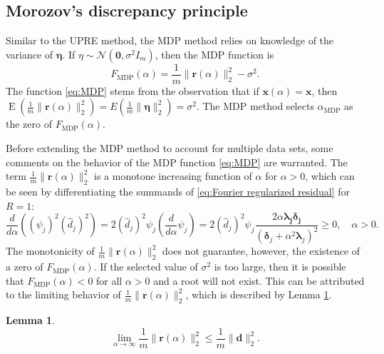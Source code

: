 \documentclass[12pt]{article}
\newcommand{\mA}{m}	%
\newcommand{\dVec}{\mathbf{d}}	%
\newcommand{\rVec}{\mathbf{r}}	%
\newcommand{\xVec}{\mathbf{x}}	%
\newcommand{\dft}[1]{\widehat{#1}}	%
\newcommand{\regparam}{\alpha}  %
\newcommand{\xReg}{\xVec(\regparam)}	%
\newcommand{\mfilt}{\psi}
\newcommand{\noise}{\eta}	%
\newcommand{\noiseSD}{\sigma}	%
\newcommand{\noiseVec}{\bm{\noise}}	%
\DeclareMathOperator{\E}{E}	%
\newcommand{\D}{F_{\text{MDP}}}	%
\newtheorem{lemma}{Lemma}[section]
\begin{document}
\subsection{Morozov's discrepancy principle} \label{sec:MDP}
Similar to the UPRE method, the MDP method relies on knowledge of the variance of $\noiseVec$. If $\noise \sim \mathcal{N}(\bm{0},\noiseSD^2 I_{\mA})$, then the MDP function is 
\begin{equation}
\label{eq:MDP}
\D(\regparam) = \frac{1}{\mA}\|\rVec(\regparam)\|_2^2 - \noiseSD^2.
\end{equation}
The function \eqref{eq:MDP} stems from the observation that if $\xReg = \xVec$, then $\E(\frac{1}{\mA}\|\rVec(\regparam)\|_2^2) = E(\frac{1}{\mA}\|\noiseVec\|_2^2) = \noiseSD^2$. The MDP method selects $\regparam_{\text{MDP}}$ as the zero of $\D(\regparam)$.  \par 
Before extending the MDP method to account for multiple data sets, some comments on the behavior of the MDP function \eqref{eq:MDP} are warranted. The term $\frac{1}{\mA}\|\rVec(\regparam)\|_2^2$ is a monotone increasing function of $\regparam$ for $\regparam > 0$, which can be seen by differentiating the summands of \eqref{eq:Fourier regularized residual} for $R = 1$:
\[\frac{d}{d\regparam}\left(\left(\mfilt_j\right)^2\left(\dft{d}_j\right)^2\right) = 2 \left(\dft{d}_j\right)^2 \mfilt_j\left(\frac{d}{d\regparam}\mfilt_j\right) = 2 \left(\dft{d}_j\right)^2 \mfilt_j \frac{2\regparam\bm{\lambda_j}\bm{\delta_j}}{\left(\bm{\delta}_j + \regparam^2 \bm{\lambda}_j\right)^2} \geq 0, \quad \regparam > 0.\]
The monotonicity of $\frac{1}{\mA}\|\rVec(\regparam)\|_2^2$ does not guarantee, however, the existence of a zero of $\D(\regparam)$. If the selected value of $\noiseSD^2$ is too large, then it is possible that $\D(\regparam) < 0$ for all $\regparam > 0$ and a root will not exist. This can be attributed to the limiting behavior of $\frac{1}{\mA}\|\rVec(\regparam)\|_2^2$, which is described by Lemma \ref{lem:Residual limit}.
\begin{lemma}
\label{lem:Residual limit}
\[\lim_{\regparam\rightarrow\infty} \frac{1}{\mA}\|\rVec(\regparam)\|_2^2 \leq \frac{1}{\mA}\|\dVec\|_2^2.\]
\end{lemma}
\end{document}
